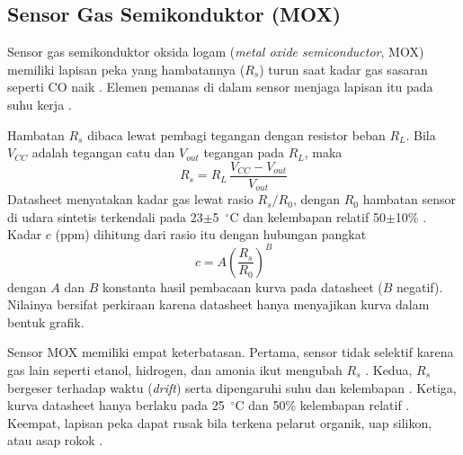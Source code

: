 
    \subsection{Sensor Gas Semikonduktor (MOX)}
    \label{sec:Sensor_MOX}

    Sensor gas semikonduktor oksida logam (\textit{metal oxide semiconductor}, MOX) memiliki lapisan peka yang hambatannya ($R_s$) turun saat kadar gas sasaran seperti CO naik \cite{mics5524}. Elemen pemanas di dalam sensor menjaga lapisan itu pada suhu kerja \cite{mics5524}.

    Hambatan $R_s$ dibaca lewat pembagi tegangan dengan resistor beban $R_L$. Bila $V_{CC}$ adalah tegangan catu dan $V_{out}$ tegangan pada $R_L$, maka
    \begin{equation}
        \label{eqn:Ch02_Rs}
        R_s = R_L\,\frac{V_{CC} - V_{out}}{V_{out}}
    \end{equation}
    Datasheet menyatakan kadar gas lewat rasio $R_s/R_0$, dengan $R_0$ hambatan sensor di udara sintetis terkendali pada 23$\pm$5~$^{\circ}$C dan kelembapan relatif 50$\pm$10\% \cite{mics5524}. Kadar $c$ (ppm) dihitung dari rasio itu dengan hubungan pangkat
    \begin{equation}
        \label{eqn:Ch02_Pangkat}
        c = A\left(\frac{R_s}{R_0}\right)^{B}
    \end{equation}
    dengan $A$ dan $B$ konstanta hasil pembacaan kurva pada datasheet ($B$ negatif). Nilainya bersifat perkiraan karena datasheet hanya menyajikan kurva dalam bentuk grafik.

    Sensor MOX memiliki empat keterbatasan. Pertama, sensor tidak selektif karena gas lain seperti etanol, hidrogen, dan amonia ikut mengubah $R_s$ \cite{mics5524, adafruit_mics}. Kedua, $R_s$ bergeser terhadap waktu (\textit{drift}) serta dipengaruhi suhu dan kelembapan \cite{mox_drift}. Ketiga, kurva datasheet hanya berlaku pada 25~$^{\circ}$C dan 50\% kelembapan relatif \cite{mics5524}. Keempat, lapisan peka dapat rusak bila terkena pelarut organik, uap silikon, atau asap rokok \cite{mics5524}.


